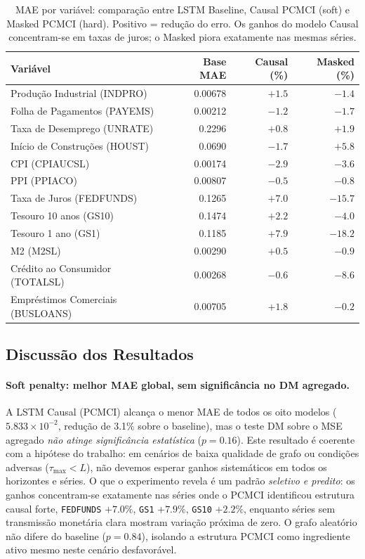 \documentclass[12pt, a4paper]{article}
\begin{document}
\begin{table}[H]
\centering
\caption{MAE por variável: comparação entre LSTM Baseline, Causal PCMCI (soft) e Masked PCMCI (hard). Positivo = redução do erro. Os ganhos do modelo Causal concentram-se em taxas de juros; o Masked piora exatamente nas mesmas séries.}
\label{tab:results_fred_per_var}
\small
\begin{tabular}{lrrr}
\toprule
Variável & Base MAE & Causal (\%) & Masked (\%) \\
\midrule
Produção Industrial (INDPRO)      & 0.00678 & $+1.5$ & $-1.4$ \\
Folha de Pagamentos (PAYEMS)      & 0.00212 & $-1.2$ & $-1.7$ \\
Taxa de Desemprego (UNRATE)       & 0.2296  & $+0.8$ & $+1.9$ \\
Início de Construções (HOUST) & 0.0690 & $-1.7$ & $\mathbf{+5.8}$ \\
CPI (CPIAUCSL)                    & 0.00174 & $-2.9$ & $-3.6$ \\
PPI (PPIACO)                      & 0.00807 & $-0.5$ & $-0.8$ \\
Taxa de Juros (FEDFUNDS) & 0.1265  & $\mathbf{+7.0}$ & $-15.7$ \\
Tesouro 10 anos (GS10)   & 0.1474  & $\mathbf{+2.2}$ & $-4.0$ \\
Tesouro 1 ano (GS1)      & 0.1185  & $\mathbf{+7.9}$ & $-18.2$ \\
M2 (M2SL)                         & 0.00290 & $+0.5$ & $-0.9$ \\
Crédito ao Consumidor (TOTALSL)   & 0.00268 & $-0.6$ & $-8.6$ \\
Empréstimos Comerciais (BUSLOANS) & 0.00705 & $+1.8$ & $-0.2$ \\
\bottomrule
\end{tabular}
\end{table}

\subsection{Discussão dos Resultados}

\paragraph{Soft penalty: melhor MAE global, sem significância no DM agregado.}
A LSTM Causal (PCMCI) alcança o menor MAE de todos os oito modelos ($5.833 \times 10^{-2}$, redução de 3.1\% sobre o baseline), mas o teste DM sobre o MSE agregado \emph{não atinge significância estatística} ($p = 0.16$). Este resultado é coerente com a hipótese do trabalho: em cenários de baixa qualidade de grafo ou condições adversas ($\tau_{\max} < L$), não devemos esperar ganhos sistemáticos em todos os horizontes e séries. O que o experimento revela é um padrão \emph{seletivo e predito}: os ganhos concentram-se exatamente nas séries onde o PCMCI identificou estrutura causal forte, \texttt{FEDFUNDS} $+7.0\%$, \texttt{GS1} $+7.9\%$, \texttt{GS10} $+2.2\%$, enquanto séries sem transmissão monetária clara mostram variação próxima de zero. O grafo aleatório não difere do baseline ($p = 0.84$), isolando a estrutura PCMCI como ingrediente ativo mesmo neste cenário desfavorável.
\end{document}
